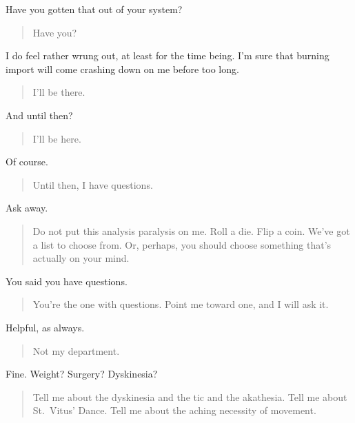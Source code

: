 Have you gotten that out of your system?

\begin{quote}
Have you?
\end{quote}

I do feel rather wrung out, at least for the time being. I'm sure that burning import will come crashing down on me before too long.

\begin{quote}
I'll be there.
\end{quote}

And until then?

\begin{quote}
I'll be here.
\end{quote}

Of course.

\begin{quote}
Until then, I have questions.
\end{quote}

Ask away.

\begin{quote}
Do not put this analysis paralysis on me. Roll a die. Flip a coin. We've got a list to choose from. Or, perhaps, you should choose something that's actually on your mind.
\end{quote}

You said you have questions.

\begin{quote}
You're the one with questions. Point me toward one, and I will ask it.
\end{quote}

Helpful, as always.

\begin{quote}
Not my department.
\end{quote}

Fine. Weight? Surgery? Dyskinesia?

\begin{quote}
Tell me about the dyskinesia and the tic and the akathesia. Tell me about St.~Vitus' Dance. Tell me about the aching necessity of movement.
\end{quote}
